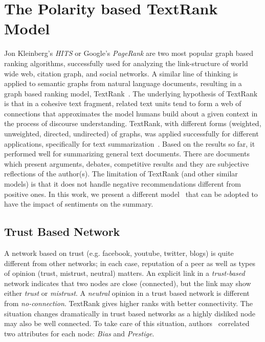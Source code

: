 \documentclass[a4paper]{report}
\begin{document}
\section{The Polarity based TextRank Model} 
Jon Kleinberg's \emph{HITS} or Google's \emph{PageRank} are two most popular 
graph based ranking algorithms, successfully used for analyzing the link-structure of world wide web, citation graph, and social networks. A similar line of thinking is applied to semantic graphs from natural language documents, resulting in a graph based ranking model, TextRank~\cite{Mihalcea04TextRank}. The underlying hypothesis of TextRank is that in a cohesive text fragment, related text units tend to form a web of connections that approximates the model humans build about a given context in the process of discourse understanding. TextRank, with different forms (weighted, unweighted, directed, undirected) of graphs, was applied successfully for different applications, specifically for text summarization~\cite{Mihalcea04graph-basedranking}. Based on the results so far, it performed well for summarizing general text documents. There are documents which present arguments, debates, competitive results and they are subjective reflections of the author(s). The limitation of TextRank (and other similar models) is that it does not handle 
negative recommendations different from positive ones. In this work, we present a different model~\cite{Mishra:2011:FBP:1963405.1963485} that can be adopted to have the impact of sentiments on the summary. 
 \subsection{Trust Based Network}
 \par A network based on trust (e.g. facebook, youtube, twitter, blogs) is quite different from other networks; in each case, reputation of a peer as well as types of opinion (trust, mistrust, neutral) matters. An explicit link in a \emph{trust-based} network indicates that two nodes are close (connected), but the link may show either \emph{trust} or \emph{mistrust}. A \emph{neutral} opinion in a trust based network is different from \emph{no-connection}. TextRank gives higher ranks with better connectivity. The situation changes dramatically in trust based networks as a highly disliked node may also be well connected. To take care of this situation, authors~\cite{Mishra:2011:FBP:1963405.1963485} correlated two attributes for each node: \emph{Bias} and \emph{Prestige}. 
\end{document}
